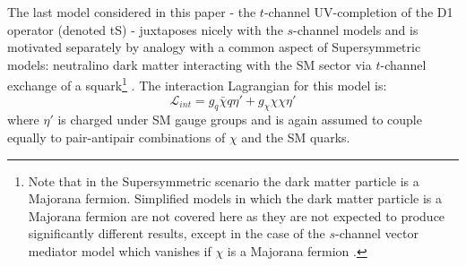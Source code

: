 \begin{flushleft}
\hspace{1cm}The last model considered in this paper - the $t$-channel UV-completion of the D1 operator (denoted tS) - juxtaposes nicely with the $s$-channel models and is motivated separately by analogy with a common aspect of Supersymmetric models: neutralino dark matter interacting with the SM sector via $t$-channel exchange of a squark\footnote{Note that in the Supersymmetric scenario the dark matter particle is a Majorana fermion. Simplified models in which the dark matter particle is a Majorana fermion are not covered here as they are not expected to produce significantly different results, except in the case of the $s$-channel vector mediator model which vanishes if $\chi$ is a Majorana fermion \cite{METSig}.} \cite{SUSYDM}. The interaction Lagrangian for this model is:
\begin{equation}
\label{L_int_tS}
\mathcal{L}_{int} = g_{q}\bar{\chi}q\eta' + g_{\chi}\chi\chi\eta'
\end{equation}
where $\eta'$ is charged under SM gauge groups and is again assumed to couple equally to pair-antipair combinations of $\chi$ and the SM quarks.


\end{flushleft}
